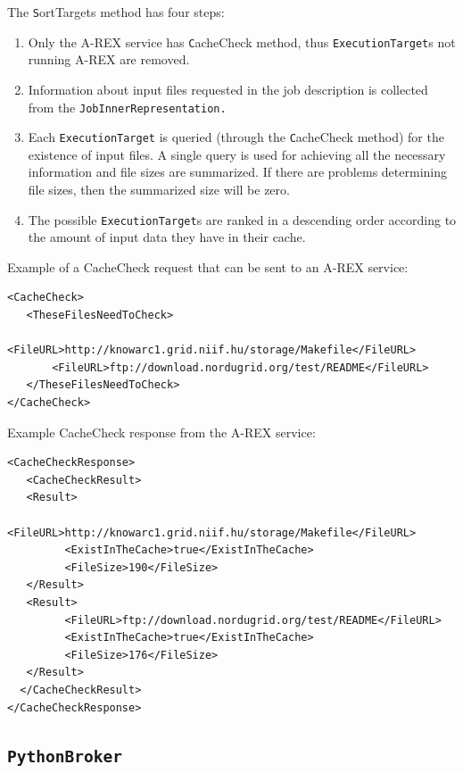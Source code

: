 \documentclass{book}
\newcommand{\PythonBroker}{\texttt{PythonBroker}}
\newcommand{\ExecutionTarget}{\texttt{ExecutionTarget}}
\begin{document}
The {\texttt SortTargets} method has four steps:

\begin{enumerate}
\item{Only the A-REX service has {\texttt CacheCheck} method, thus
  {\ExecutionTarget}s not running A-REX are removed.}
\item{Information about input files requested in the job description
  is collected from the \texttt{JobInnerRepresentation.}}
\item{Each {\ExecutionTarget} is queried (through the {\texttt
    CacheCheck} method) for the existence of input files.  A single
  query is used for achieving all the necessary information and file
  sizes are summarized. If there are problems determining file sizes,
  then the summarized size will be zero.}
\item{The possible {\ExecutionTarget}s are ranked in a descending
  order according to the amount of input data they have in their
  cache.}
\end{enumerate}

Example of a CacheCheck request that can be sent to an A-REX service:

\begin{shaded}
\begin{verbatim}
<CacheCheck>
   <TheseFilesNeedToCheck>
       <FileURL>http://knowarc1.grid.niif.hu/storage/Makefile</FileURL>
       <FileURL>ftp://download.nordugrid.org/test/README</FileURL>
   </TheseFilesNeedToCheck>
</CacheCheck>
\end{verbatim}
\end{shaded}

Example CacheCheck response from the A-REX service:

\begin{shaded}
\begin{verbatim}
<CacheCheckResponse>
   <CacheCheckResult>
   <Result>
         <FileURL>http://knowarc1.grid.niif.hu/storage/Makefile</FileURL>
         <ExistInTheCache>true</ExistInTheCache>
         <FileSize>190</FileSize>
   </Result>
   <Result>
         <FileURL>ftp://download.nordugrid.org/test/README</FileURL>
         <ExistInTheCache>true</ExistInTheCache>
         <FileSize>176</FileSize>
   </Result>
  </CacheCheckResult>
</CacheCheckResponse>
\end{verbatim}
\end{shaded}
   
\subsection{\PythonBroker}
\end{document}
